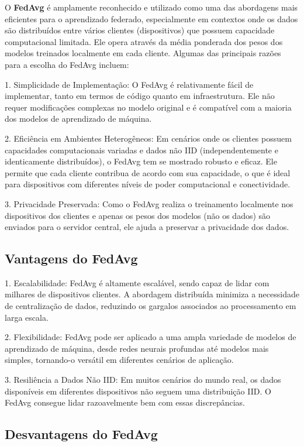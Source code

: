 O \textbf{FedAvg} é amplamente reconhecido e utilizado como uma das abordagens mais eficientes para o aprendizado federado, especialmente em contextos onde os dados são distribuídos entre vários clientes (dispositivos) que possuem capacidade computacional limitada. Ele opera através da média ponderada dos pesos dos modelos treinados localmente em cada cliente. Algumas das principais razões para a escolha do FedAvg incluem:

1. Simplicidade de Implementação: O FedAvg é relativamente fácil de implementar, tanto em termos de código quanto em infraestrutura. Ele não requer modificações complexas no modelo original e é compatível com a maioria dos modelos de aprendizado de máquina.

2. Eficiência em Ambientes Heterogêneos: Em cenários onde os clientes possuem capacidades computacionais variadas e dados não IID (independentemente e identicamente distribuídos), o FedAvg tem se mostrado robusto e eficaz. Ele permite que cada cliente contribua de acordo com sua capacidade, o que é ideal para dispositivos com diferentes níveis de poder computacional e conectividade.

3. Privacidade Preservada: Como o FedAvg realiza o treinamento localmente nos dispositivos dos clientes e apenas os pesos dos modelos (não os dados) são enviados para o servidor central, ele ajuda a preservar a privacidade dos dados.

\subsection{Vantagens do FedAvg}

1. Escalabilidade: FedAvg é altamente escalável, sendo capaz de lidar com milhares de dispositivos clientes. A abordagem distribuída minimiza a necessidade de centralização de dados, reduzindo os gargalos associados ao processamento em larga escala.

2. Flexibilidade: FedAvg pode ser aplicado a uma ampla variedade de modelos de aprendizado de máquina, desde redes neurais profundas até modelos mais simples, tornando-o versátil em diferentes cenários de aplicação.

3. Resiliência a Dados Não IID: Em muitos cenários do mundo real, os dados disponíveis em diferentes dispositivos não seguem uma distribuição IID. O FedAvg consegue lidar razoavelmente bem com essas discrepâncias.

\subsection{Desvantagens do FedAvg}

